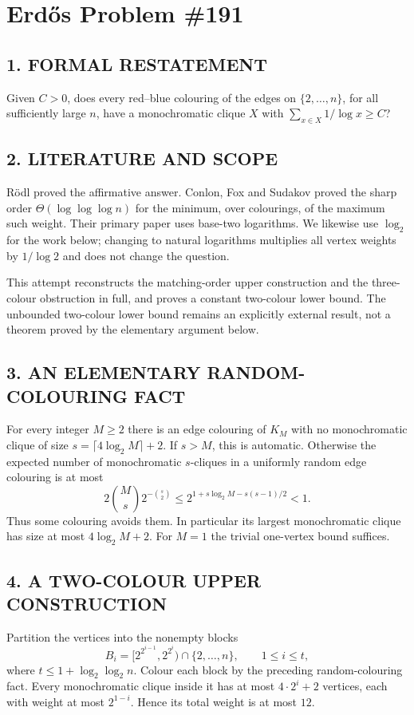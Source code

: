 \section{Erd\H{o}s Problem \#191}
\subsection*{1. FORMAL RESTATEMENT}
Given $C>0$, does every red--blue colouring of the edges on $\{2,\ldots,n\}$, for all sufficiently large $n$, have a monochromatic clique $X$ with $\sum_{x\in X}1/\log x\ge C$?
\subsection*{2. LITERATURE AND SCOPE}
R\"odl proved the affirmative answer. Conlon, Fox and Sudakov proved the sharp order $\Theta(\log\log\log n)$ for the minimum, over colourings, of the maximum such weight. Their primary paper uses base-two logarithms. We likewise use $\log_2$ for the work below; changing to natural logarithms multiplies all vertex weights by $1/\log 2$ and does not change the question.

This attempt reconstructs the matching-order upper construction and the three-colour obstruction in full, and proves a constant two-colour lower bound. The unbounded two-colour lower bound remains an explicitly external result, not a theorem proved by the elementary argument below.
\subsection*{3. AN ELEMENTARY RANDOM-COLOURING FACT}
For every integer $M\ge2$ there is an edge colouring of $K_M$ with no monochromatic clique of size
$s=\lceil4\log_2 M\rceil+2$.
If $s>M$, this is automatic. Otherwise the expected number of monochromatic $s$-cliques in a uniformly random edge colouring is at most
\[
 2\binom Ms2^{-\binom s2}\le2^{1+s\log_2 M-s(s-1)/2}<1.
\]
Thus some colouring avoids them. In particular its largest monochromatic clique has size at most $4\log_2 M+2$. For $M=1$ the trivial one-vertex bound suffices.
\subsection*{4. A TWO-COLOUR UPPER CONSTRUCTION}
Partition the vertices into the nonempty blocks
\[
 B_i=[2^{2^{i-1}},2^{2^i})\cap\{2,\ldots,n\},\qquad 1\le i\le t,
\]
where $t\le1+\log_2\log_2 n$. Colour each block by the preceding random-colouring fact. Every monochromatic clique inside it has at most $4\cdot2^i+2$ vertices, each with weight at most $2^{1-i}$. Hence its total weight is at most $12$.


